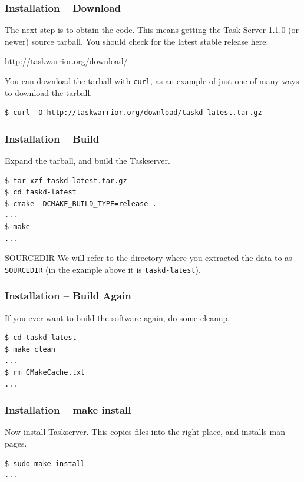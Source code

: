 \documentclass[t,handout]{beamer}
\begin{document}
\begin{frame}[fragile]\frametitle{Installation -- Download}\label{download}
    \vfill
    The next step is to obtain the code. This means getting the Task Server 1.1.0 (or newer) source tarball.  You should check for the latest stable release here:

    \href{http://taskwarrior.org/download/}{http://taskwarrior.org/download/}

    \vfill
    You can download the tarball with \verb+curl+, as an example of just one of many ways to download the tarball.

    \begin{lstlisting}
$ curl -O http://taskwarrior.org/download/taskd-latest.tar.gz\end{lstlisting}
\end{frame}

\begin{frame}[fragile]\frametitle{Installation -- Build}\label{buildtar}
    \vfill
    Expand the tarball, and build the Taskserver.

    \begin{lstlisting}
$ tar xzf taskd-latest.tar.gz
$ cd taskd-latest
$ cmake -DCMAKE_BUILD_TYPE=release .
...
$ make
...\end{lstlisting}

    \begin{alertblock}{SOURCEDIR}
        We will refer to the directory where you extracted the data to as \verb=SOURCEDIR= (in the example above it is \verb=taskd-latest=).
    \end{alertblock}
\end{frame}

\begin{frame}[fragile]\frametitle{Installation -- Build Again}\label{buildagain}
    \vfill
    If you ever want to build the software again, do some cleanup.

    \begin{lstlisting}
$ cd taskd-latest
$ make clean
...
$ rm CMakeCache.txt
...\end{lstlisting}
\end{frame}

\begin{frame}[fragile]\frametitle{Installation -- make install}
    \vfill
    Now install Taskserver.  This copies files into the right place, and installs man pages.

    \begin{lstlisting}
$ sudo make install
...\end{lstlisting}
\end{frame}
\end{document}
